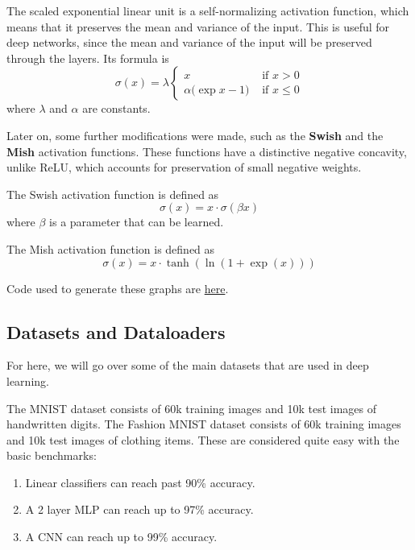 \documentclass{article}
\begin{document}
    \begin{definition}[SELU]
      The scaled exponential linear unit is a self-normalizing activation function, which means that it preserves the mean and variance of the input. This is useful for deep networks, since the mean and variance of the input will be preserved through the layers. Its formula is 
        \[\sigma(x) = \lambda \begin{cases} x & \text{ if } x > 0 \\ \alpha \big(\exp{x} - 1 \big) & \text{ if } x \leq 0 \end{cases}\]
      where $\lambda$ and $\alpha$ are constants.
    \end{definition}
    
    Later on, some further modifications were made, such as the \textbf{Swish} and the \textbf{Mish} \cite{misra2020mish} activation functions. These functions have a distinctive negative concavity, unlike ReLU, which accounts for preservation of small negative weights.  

    \begin{definition}[Swish]
      The Swish activation function is defined as 
      \[\sigma(x) = x \cdot \sigma(\beta x) \]
      where $\beta$ is a parameter that can be learned. 
    \end{definition}

    \begin{definition}[Mish]
      The Mish activation function is defined as 
        \[\sigma(x) = x \cdot \tanh(\ln(1 + \exp(x))) \]
    \end{definition}

    \begin{code} 
      Code used to generate these graphs are \href{code/activation_functions.ipynb}{here}.
    \end{code} 

  \subsection{Datasets and Dataloaders} 

    For here, we will go over some of the main datasets that are used in deep learning. 

    \begin{definition}
      The MNIST dataset consists of 60k training images and 10k test images of handwritten digits. The Fashion MNIST dataset consists of 60k training images and 10k test images of clothing items. These are considered quite easy with the basic benchmarks: 
      \begin{enumerate} 
        \item Linear classifiers can reach past 90\% accuracy. 
        \item A 2 layer MLP can reach up to 97\% accuracy. 
        \item A CNN can reach up to 99\% accuracy. 
      \end{enumerate}
    \end{definition}
\end{document}
